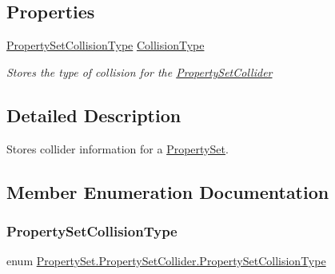 \subsection*{Properties}
\begin{DoxyCompactItemize}
\item 
\hyperlink{class_property_set_1_1_property_set_collider_a6c640ed4b9ab14dffc7da13b1e4bf51e}{Property\+Set\+Collision\+Type} \hyperlink{class_property_set_1_1_property_set_collider_a68838b774adc4d08f1b07c819263f90b}{Collision\+Type}
\begin{DoxyCompactList}\small\item\em Stores the type of collision for the \hyperlink{class_property_set_1_1_property_set_collider}{Property\+Set\+Collider} \end{DoxyCompactList}\end{DoxyCompactItemize}


\subsection{Detailed Description}
Stores collider information for a \hyperlink{struct_property_set}{Property\+Set}. 



\subsection{Member Enumeration Documentation}
\mbox{\label{class_property_set_1_1_property_set_collider_a6c640ed4b9ab14dffc7da13b1e4bf51e}} 
\subsubsection{\texorpdfstring{Property\+Set\+Collision\+Type}{PropertySetCollisionType}}
{\footnotesize\ttfamily enum \hyperlink{class_property_set_1_1_property_set_collider_a6c640ed4b9ab14dffc7da13b1e4bf51e}{Property\+Set.\+Property\+Set\+Collider.\+Property\+Set\+Collision\+Type}\hspace{0.3cm}{\ttfamily [strong]}}




